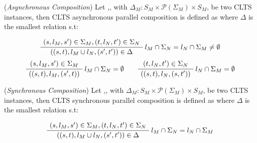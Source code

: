 \begin{definition} 
	\label{def:asynchronous_composition}(\emph{Asynchronous Composition}) Let ,, with $\Delta_M : S_M \times \mathcal{P}(\Sigma_M) \times S_M$, be two CLTS instances, then CLTS asynchronous parallel composition is defined as  where $\Delta$ is the smallest relation s.t:
	\begin{center}
		\begin{equation}
		\AxiomC{$(s, l_M, s') \in \Sigma_M,(t, l_N, t') \in \Sigma_N  $}\RightLabel{$l_M \cap \Sigma_N = l_N \cap \Sigma_M \neq \emptyset$}
		\UnaryInfC{$((s,t),l_M \cup l_N,(s',t')) \in \Delta$}
		\DisplayProof
		\end{equation}	
		\begin{equation}
		\AxiomC{$(s, l_M, s') \in \Sigma_M $}\RightLabel{$l_M \cap \Sigma_N = \emptyset$}
		\UnaryInfC{$((s,t),l_M,(s',t))$}
		\DisplayProof
		\quad\quad
		\AxiomC{$(t, l_N, t') \in \Sigma_N $}\RightLabel{$l_N \cap \Sigma_M = \emptyset$}
		\UnaryInfC{$((s,t),l_N,(s,t'))$}
		\DisplayProof
		\end{equation}
	\end{center}
\end{definition}

\begin{definition} 
	\label{def:synchronous_composition}(\emph{Synchronous Composition}) Let ,, with $\Delta_M : S_M \times \mathcal{P}(\Sigma_M) \times S_M$, be two CLTS instances, then CLTS synchronous parallel composition is defined as  where $\Delta$ is the smallest relation s.t:
	\begin{center}
		\begin{equation}
		\AxiomC{$(s, l_M, s') \in \Sigma_M,(t, l_N, t') \in \Sigma_N  $}\RightLabel{$l_M \cap \Sigma_N = l_N \cap \Sigma_M$}
		\UnaryInfC{$((s,t),l_M \cup l_N,(s',t')) \in \Delta$}
		\DisplayProof
		\end{equation}	
	\end{center}
\end{definition}


